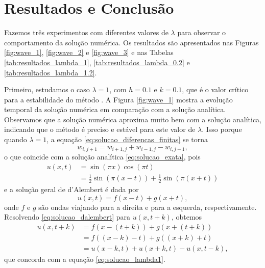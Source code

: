 \documentclass[11pt]{article}
\begin{document}
\section{Resultados e Conclusão}

Fazemos três experimentos com diferentes valores de \(\lambda\) para observar o comportamento da solução numérica. Os resultados são apresentados nas Figuras \ref{fig:wave_1}, \ref{fig:wave_2} e \ref{fig:wave_3} e nas Tabelas \ref{tab:resultados_lambda_1}, \ref{tab:resultados_lambda_0.2} e \ref{tab:resultados_lambda_1.2}.

Primeiro, estudamos o caso \(\lambda = 1\), com \(h = 0.1\) e \(k = 0.1\), que é o valor crítico para a estabilidade do método \cite{IK}. A Figura \ref{fig:wave_1} mostra a evolução temporal da solução numérica em comparação com a solução analítica. Observamos que a solução numérica aproxima muito bem com a solução analítica, indicando que o método é preciso e estável para este valor de \(\lambda\). Isso porque quando \(\lambda = 1\), a equação \eqref{eq:solucao_diferencas_finitas} se torna
\begin{equation}\label{eq:solucao_lambda1}
    w_{i, j+1} = w_{i+1, j} + w_{i-1, j} - w_{i, j-1},
\end{equation} o que coincide com a solução analítica \eqref{eq:solucao_exata}, pois
\begin{align}
    u(x, t) &= \sin(\pi x) \cos(\pi t) \\
    &= \frac{1}{2} \sin(\pi (x - t)) + \frac{1}{2} \sin(\pi (x + t))
\end{align} e a solução geral de d'Alembert é dada por \cite[134]{moyses_ondas}
\begin{equation}\label{eq:solucao_dalembert}
    u(x, t) = f(x - t) + g(x + t),
\end{equation} onde \(f\) e \(g\) são ondas viajando para a direita e para a esquerda, respectivamente. Resolvendo \eqref{eq:solucao_dalembert} para \(u(x, t + k)\), obtemos
\begin{align}
    u(x, t + k) &= f(x - (t + k)) + g(x + (t + k)) \\
    &= f((x - k) - t) + g((x + k) + t) \\
    &= u(x - k, t) + u(x + k, t) - u(x, t - k),
\end{align} que concorda com a equação \eqref{eq:solucao_lambda1}.
\end{document}
